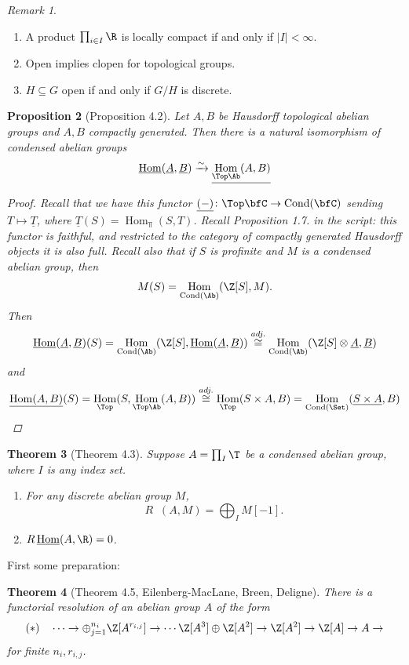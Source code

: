 \documentclass[A4paper, british]{amsart}
\theoremstyle{darkgreentheorem}
\newtheorem{thm}{Theorem}[section]
\newtheorem{prop}[thm]{Proposition}
\theoremstyle{darkbluedefinition}
\theoremstyle{darkredexample}
\theoremstyle{remark}
\newtheorem{rem}[thm]{Remark}
\DeclareMathOperator{\Hom}{Hom}
\DeclareMathOperator{\Cond}{Cond}
\DeclareMathOperator{\ihom}{\underline{Hom}}
\newcommand{\1}{\mathbbm{1}}
\renewcommand{\u}[1]{\underline{#1}}
\newcommand{\ot}{\otimes}
\newcommand{\op}{\oplus}
\newcommand{\tms}{\times}
\newcommand{\sub}{\subseteq}
\begin{document}
\begin{rem}
    \begin{enumerate}[label=\roman*)]
	\item A product $\prod_{i\in I}\R$ is locally compact if and only if $|I|<\infty$.
	\item Open implies clopen for topological groups.
	\item $H\sub G$ open if and only if $G/H$ is discrete.
    \end{enumerate}
\end{rem}

\begin{prop}[Proposition 4.2]
    Let $A,B$ be Hausdorff topological abelian groups and $A,B$ compactly generated.
    Then there is a natural isomorphism of condensed abelian groups
    \[ \ihom(\u{A},\u{B})\xrightarrow{\sim} \u{\Hom_{\Top\Ab}(A,B)} \]
    \begin{proof}
	Recall that we have this functor $\u{(-)}\colon \Top\bfC\to \Cond(\bfC)$ sending $T\mapsto \u{T}$, where $\u{T}(S)=\Hom_{\Top}(S,T)$.
	Recall Proposition 1.7. in the script: this functor is faithful, and restricted to the category of compactly generated Hausdorff objects it is also full.
	Recall also that if $S$ is profinite and $M$ is a condensed abelian group, then
	\[ M(S)=\Hom_{\Cond(\Ab)}(\Z[S],M). \]
	Then
	\[ \ihom(\u{A},\u{B})(S)=\Hom_{\Cond(\Ab)}(\Z[S],\ihom(\u{A},\u{B}))\overset{adj.}{\cong} \Hom_{\Cond(\Ab)}(\Z[S]\ot \u{A}, \u{B}) \]
	and
	\[ \u{\Hom(A,B)}(S)=\Hom_{\Top}(S,\Hom_{\Top\Ab}(A,B))\overset{adj.}{\cong} \Hom_{\Top}(S\tms A,B)=\Hom_{\Cond(\Set)}(\u{S\tms A},B) \]
    \end{proof}
\end{prop}

\begin{thm}[Theorem 4.3]
    Suppose $A=\prod_{I}\T$ be a condensed abelian group, where $I$ is any index set.
    \begin{enumerate}[label=\roman*)]
	\item For any discrete abelian group $M$,
	    \[ R\ihom(A,M)=\bigoplus_{I}M[-1]. \]
	\item $R\ihom(A,\R)=0$.
    \end{enumerate}
\end{thm}

First some preparation:

\begin{thm}[Theorem 4.5, Eilenberg-MacLane, Breen, Deligne]
    There is a functorial resolution of an abelian group $A$ of the form
    \[ (*)\quad \cdots \to \op_{j=1}^{n_{i}}\Z[A^{r_{{i,j}}}]\to \cdots \Z[A^{3}]\op \Z[A^{2}]\to \Z[A^{2}]\to \Z[A]\to A\to \]
    for finite $n_{i},r_{i,j}$.
\end{thm}
\end{document}
